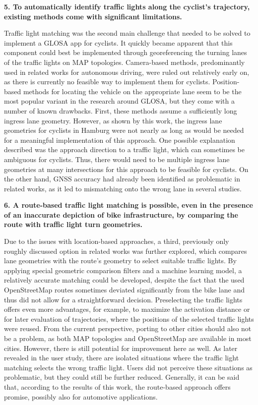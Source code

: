 \textbf{\color{cidarkblue}5. To automatically identify traffic lights along the cyclist's trajectory, existing methods come with significant limitations.} 

Traffic light matching was the second main challenge that needed to be solved to implement a GLOSA app for cyclists. It quickly became apparent that this component could best be implemented through georeferencing the turning lanes of the traffic lights on MAP topologies. Camera-based methods, predominantly used in related works for autonomous driving, were ruled out relatively early on, as there is currently no feasible way to implement them for cyclists. Position-based methods for locating the vehicle on the appropriate lane seem to be the most popular variant in the research around GLOSA, but they come with a number of known drawbacks. First, these methods assume a sufficiently long ingress lane geometry. However, as shown by this work, the ingress lane geometries for cyclists in Hamburg were not nearly as long as would be needed for a meaningful implementation of this approach. One possible explanation described was the approach direction to a traffic light, which can sometimes be ambiguous for cyclists. Thus, there would need to be multiple ingress lane geometries at many intersections for this approach to be feasible for cyclists. On the other hand, GNSS accuracy had already been identified as problematic in related works, as it led to mismatching onto the wrong lane in several studies.

\textbf{\color{cidarkblue}6. A route-based traffic light matching is possible, even in the presence of an inaccurate depiction of bike infrastructure, by comparing the route with traffic light turn geometries.}

Due to the issues with location-based approaches, a third, previously only roughly discussed option in related works was further explored, which compares lane geometries with the route's geometry to select suitable traffic lights. By applying special geometric comparison filters and a machine learning model, a relatively accurate matching could be developed, despite the fact that the used OpenStreetMap routes sometimes deviated significantly from the bike lane and thus did not allow for a straightforward decision. Preselecting the traffic lights offers even more advantages, for example, to maximize the activation distance or for later evaluation of trajectories, where the positions of the selected traffic lights were reused. From the current perspective, porting to other cities should also not be a problem, as both MAP topologies and OpenStreetMap are available in most cities. However, there is still potential for improvement here as well. As later revealed in the user study, there are isolated situations where the traffic light matching selects the wrong traffic light. Users did not perceive these situations as problematic, but they could still be further reduced. Generally, it can be said that, according to the results of this work, the route-based approach offers promise, possibly also for automotive applications.

